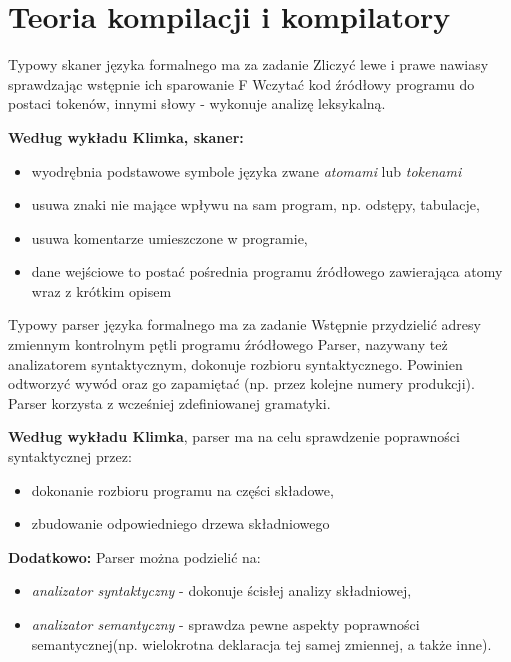 \chapter{Teoria kompilacji i kompilatory}
\PartialToc

\answer
{Typowy skaner języka formalnego ma za zadanie}
{Zliczyć lewe i prawe nawiasy sprawdzając wstępnie ich sparowanie}
{F}
{Wczytać kod źródłowy programu do postaci tokenów, innymi słowy - wykonuje analizę leksykalną.}
{\textbf{Według wykładu Klimka, skaner:}

\begin{itemize}
\item wyodrębnia podstawowe symbole języka zwane \textit{atomami} lub \textit{tokenami}
\item usuwa znaki nie mające wpływu na sam program, np. odstępy, tabulacje,
\item usuwa komentarze umieszczone w programie,
\item dane wejściowe to postać pośrednia programu źródłowego zawierająca atomy wraz z krótkim opisem
\end{itemize}}

\answer
{Typowy parser języka formalnego ma za zadanie}
{Wstępnie przydzielić adresy zmiennym kontrolnym pętli programu źródłowego}
{}
{Parser, nazywany też analizatorem syntaktycznym, dokonuje rozbioru syntaktycznego. Powinien odtworzyć wywód oraz go zapamiętać (np. przez kolejne numery produkcji). Parser korzysta z wcześniej zdefiniowanej gramatyki.}
{\textbf{Według wykładu Klimka}, parser ma na celu sprawdzenie poprawności syntaktycznej przez:

\begin{itemize}
\item dokonanie rozbioru programu na części składowe,
\item zbudowanie odpowiedniego drzewa składniowego
\end{itemize}
\textbf{Dodatkowo:}
Parser można podzielić na:
\begin{itemize}
\item \textit{analizator syntaktyczny} - dokonuje ścisłej analizy składniowej,
\item \textit{analizator semantyczny} - sprawdza pewne aspekty poprawności semantycznej(np. wielokrotna deklaracja tej samej zmiennej, a także inne).
\end{itemize}
}

